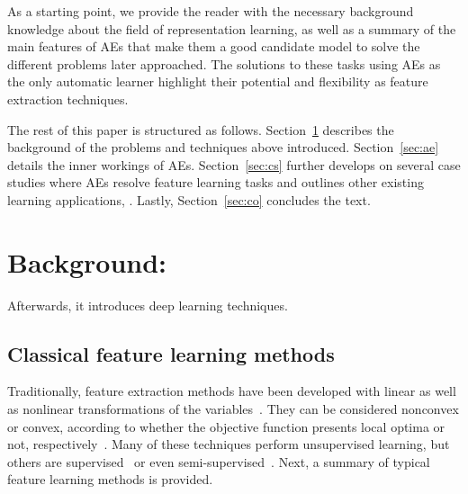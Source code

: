 As a starting point, we provide the reader with the necessary background knowledge about the field of representation learning, as well as a summary of the main features of AEs that make them a good candidate model to solve the different problems later approached. The solutions to these tasks using AEs as the only automatic learner highlight their potential and flexibility as feature extraction techniques. 


The rest of this paper is structured as follows. Section~\ref{sec:bg} describes the background of the problems and techniques above introduced. Section~\ref{sec:ae} details the inner workings of AEs. Section~\ref{sec:cs} further develops on several case studies where AEs resolve feature learning tasks and outlines other existing learning applications, . Lastly, Section~\ref{sec:co} concludes the text.



\section{Background: }\label{sec:bg}

 Afterwards, it introduces deep learning techniques.

\subsection{Classical feature learning methods}

Traditionally, feature extraction methods have been developed with linear as well as nonlinear transformations of the variables~. They can be considered nonconvex or convex, according to whether the objective function presents local optima or not, respectively~. Many of these techniques perform unsupervised learning, but others are supervised~ or even semi-supervised~. Next, a summary of typical feature learning methods is provided.

